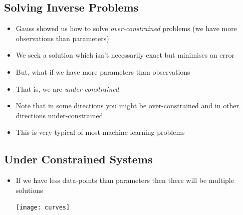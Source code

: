 \documentclass[25pt,landscape,footrule]{foils}
\begin{document}
\begin{slide}
\section{Solving Inverse Problems}

\begin{PauseHighLight}
  \begin{itemize}
  \item Gauss showed us how to solve \emph{over-constrained} problems
    (we have more observations than parameters)\pause
  \item We seek a solution which isn't necessarily exact but minimises
    an error\pause
  \item But, what if we have more parameters than observations\pause
  \item That is, we are \emph{under-constrained}\pause
  \item Note that in some directions you might be over-constrained and
    in other directions under-constrained\pause
  \item This is very typical of most machine learning problems\pauseb
  \end{itemize}
\end{PauseHighLight}

\end{slide}


\begin{slide}
\section[-2]{Under Constrained Systems}

\begin{PauseHighLight}
  \begin{itemize}
  \item If we have less data-points than parameters then there will be
    multiple solutions
  \begin{center}
    \texttt{[image: curves]}\pause
  \end{center}
  \end{itemize}
\end{PauseHighLight}

\end{slide}


\end{document}
